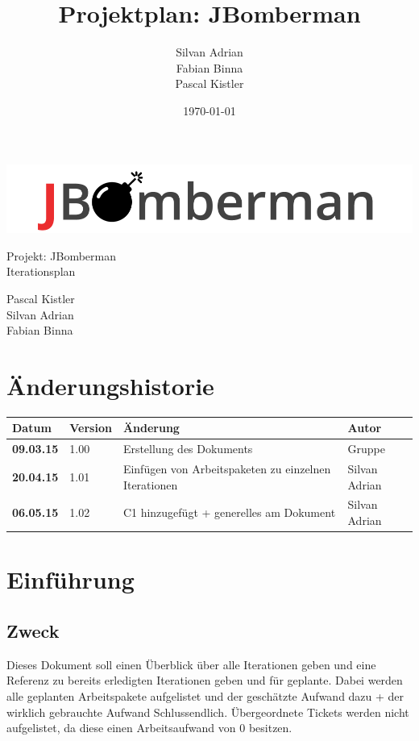 \documentclass[11pt]{scrartcl}
\title{Projektplan: JBomberman}
\author{Silvan Adrian \\ Fabian Binna \\ Pascal Kistler}
\date{\today{}}
\begin{document}
\def\arraystretch{1.5}
\begin{titlepage}
\begin{center}
\vspace{10em}
\includegraphics[scale=2]{jbomberman}
\vspace{10em}
\end{center}
\begin{center}
\huge {Projekt: JBomberman} \\
\huge {Iterationsplan}
\end{center}
\begin{center}
\vspace{10em}
\LARGE {Pascal Kistler} \\
\LARGE {Silvan Adrian} \\
\LARGE {Fabian Binna}
\end{center}

\end{titlepage}

\newpage
\section{Änderungshistorie}
\label{sec:Änderungen}

\begin{tabularx}{\linewidth}{l l X l}
\textbf{Datum} & \textbf{Version} & \textbf{Änderung}  & \textbf{Autor} \\
\hline
\textbf{09.03.15} & 1.00 & Erstellung des Dokuments & Gruppe \\
\bf{20.04.15} & 1.01 & Einfügen von Arbeitspaketen zu einzelnen Iterationen & 
Silvan Adrian\\
\bf{06.05.15} & 1.02 & C1 hinzugefügt + generelles am Dokument & Silvan Adrian\\
\end{tabularx}

\newpage
\tableofcontents
\newpage
\section{Einführung}
\subsection{Zweck}
Dieses Dokument soll einen Überblick über alle Iterationen geben und eine 
Referenz zu bereits erledigten Iterationen geben und für geplante.
Dabei werden alle geplanten Arbeitspakete aufgelistet und der geschätzte Aufwand 
dazu + der wirklich gebrauchte Aufwand Schlussendlich.
Übergeordnete Tickets werden nicht aufgelistet, da diese einen Arbeitsaufwand 
von 0 besitzen.
\end{document}
